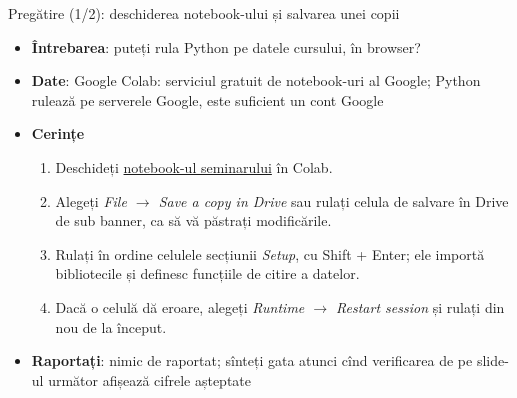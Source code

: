 \begin{frame}{Pregătire (1/2): deschiderea notebook-ului și salvarea unei copii}
\itemsize{\small}
\begin{itemize}
\item \textbf{Întrebarea}: puteți rula Python pe datele cursului, în browser?
\item \textbf{Date}: Google Colab: serviciul gratuit de notebook-uri al Google; Python rulează pe serverele Google, este suficient un cont Google
\item \textbf{Cerințe}
\begin{enumerate}
    \item Deschideți \href{\nb}{notebook-ul seminarului} în Colab.
    \item Alegeți \emph{File $\to$ Save a copy in Drive} sau rulați celula de salvare în Drive de sub banner, ca să vă păstrați modificările.
    \item Rulați în ordine celulele secțiunii \emph{Setup}, cu Shift + Enter; ele importă bibliotecile și definesc funcțiile de citire a datelor.
    \item Dacă o celulă dă eroare, alegeți \emph{Runtime $\to$ Restart session} și rulați din nou de la început.
\end{enumerate}
\item \textbf{Raportați}: nimic de raportat; sînteți gata atunci cînd verificarea de pe slide-ul următor afișează cifrele așteptate
\end{itemize}
\end{frame}

